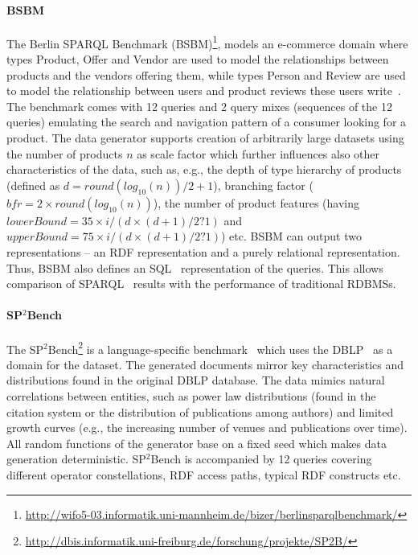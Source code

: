 \paragraph{BSBM} The Berlin SPARQL Benchmark (BSBM)\footnote{\url{http://wifo5-03.informatik.uni-mannheim.de/bizer/berlinsparqlbenchmark/}}, models an e-commerce domain where types Product, Offer and Vendor are used to model the relationships between products and the vendors offering them, while types Person and Review are used to model the relationship between users and product reviews these users write~\cite{Bizer09theberlin}.
The benchmark comes with 12 queries and 2 query mixes (sequences of the 12 queries) emulating the search and navigation pattern of a consumer looking for a product. The data generator supports creation of arbitrarily large datasets using the number of products $n$ as scale factor which further influences also other characteristics of the data, such as, e.g., the depth of type hierarchy of products (defined as $d = round(log_{10}(n))/2 + 1$), branching factor ($bfr = 2 \times round(log_{10}(n))$), the number of product features (having $lowerBound = 35 \times i / (d \times (d+1)/2 ? 1)$ and $upperBound = 75 \times i / (d \times (d+1)/2 ? 1)$) etc. BSBM can output two representations -- an RDF representation and a purely relational representation. Thus, BSBM also defines an SQL~\cite{sql} representation of the queries. This allows comparison of SPARQL~\cite{sparql} results with the performance of traditional RDBMSs.


\paragraph{SP$^2$Bench} The SP$^2$Bench\footnote{\url{http://dbis.informatik.uni-freiburg.de/forschung/projekte/SP2B/}} is a language-specific benchmark~\cite{Schmidt2010} which uses the DBLP~\cite{dblp} as a domain for the dataset. %
The generated documents mirror key characteristics and distributions found in the original DBLP database. The data mimics natural correlations between entities, such as power law distributions (found in the citation system or the distribution of publications among authors) and limited growth curves (e.g., the increasing number of venues and publications over time). All random functions of the generator base on a fixed seed which makes data generation deterministic. SP$^2$Bench is accompanied by 12 queries covering different operator constellations, RDF access paths, typical RDF constructs etc.

